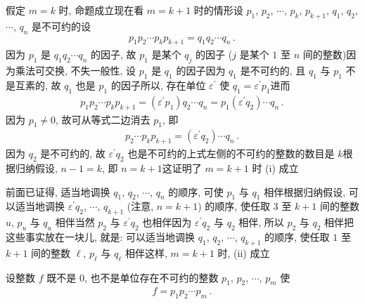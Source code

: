 \begin{pf}
    假定 $m=k$ 时, 命题成立\period 现在看 $m=k+1$ 时的情形\period 设 $p_1$, $p_2$, $\cdots$, $p_k$, $p_{k+1}$, $q_1$, $q_2$, $\cdots$, $q_n$ 是不可约的\period 设
    \begin{align*}
        p_1 p_2 \cdots p_k p_{k+1} = q_1 q_2 \cdots q_n \period
    \end{align*}
    因为 $p_1$ 是 $q_1 q_2 \cdots q_n$ 的因子, 故 $p_1$ 是某个 $q_j$ 的因子 ($j$ 是某个 $1$ 至 $n$ 间的整数)\period 因为乘法可交换, 不失一般性, 设 $p_1$ 是 $q_1$ 的因子\period 因为 $q_1$ 是不可约的, 且 $q_1$ 与 $p_1$ 不是互素的, 故 $q_1$ 也是 $p_1$ 的因子\period 所以, 存在单位 $\varepsilon^{\prime}$ 使 $q_1 = \varepsilon^{\prime} p_1$\period 进而
    \begin{align*}
        p_1 p_2 \cdots p_k p_{k+1} = (\varepsilon^{\prime} p_1) q_2 \cdots q_n = p_1 (\varepsilon^{\prime} q_2) \cdots q_n \period
    \end{align*}
    因为 $p_1 \neq 0$, 故可从等式二边消去 $p_1$, 即
    \begin{align*}
        p_2 \cdots p_k p_{k+1} = (\varepsilon^{\prime} q_2) \cdots q_n \period
    \end{align*}
    因为 $q_2$ 是不可约的, 故 $\varepsilon^{\prime} q_2$ 也是不可约的\period 上式左侧的不可约的整数的数目是 $k$\period 根据归纳假设, $n-1 = k$, 即 $n = k+1$\period 这证明了 $m=k+1$ 时 (i) 成立\period

    前面已证得, 适当地调换 $q_1$, $q_2$, $\cdots$, $q_n$ 的顺序, 可使 $p_1$ 与 $q_1$ 相伴\period 根据归纳假设, 可以适当地调换 $\varepsilon^{\prime} q_2$, $\cdots$, $q_{k+1}$ (注意, $n = k+1$) 的顺序, 使任取 $3$ 至 $k+1$ 间的整数 $u$, $p_u$ 与 $q_u$ 相伴\period 当然 $p_2$ 与 $\varepsilon^{\prime} q_2$ 也相伴\period 因为 $\varepsilon^{\prime} q_2$ 与 $q_2$ 相伴, 所以 $p_2$ 与 $q_2$ 相伴\period 把这些事实放在一块儿, 就是: 可以适当地调换 $q_1$, $q_2$, $\cdots$, $q_{k+1}$ 的顺序, 使任取 $1$ 至 $k+1$ 间的整数 $\ell$, $p_{\ell}$ 与 $q_{\ell}$ 相伴\period 这样, $m = k+1$ 时, (ii) 成立\period
\end{pf}

\begin{proposition}
    设整数 $f$ 既不是 $0$, 也不是单位\period 存在不可约的整数 $p_1$, $p_2$, $\cdots$, $p_m$ 使
    \begin{align*}
        f = p_1 p_2 \cdots p_m \period
    \end{align*}
\end{proposition}

